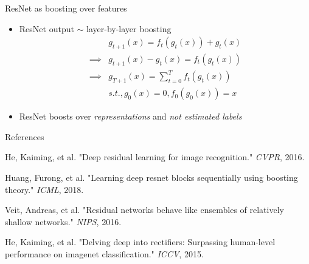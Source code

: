 \documentclass[10pt]{beamer}
\begin{document}
\begin{frame}{ResNet as boosting over features \cite{resnet_as_boosting_huang2018}}
	\begin{itemize}
		\item ResNet output $\sim$ layer-by-layer boosting 
			\begin{equation}
				\begin{split}
				& g_{t+1}(x) = f_t(g_t(x)) + g_t(x) \\
				\implies & g_{t+1}(x) - g_t(x) = f_t(g_t(x))  \\
				\implies & g_{T+1}(x) = \sum_{t=0}^{T}f_t(g_t(x)) \\
				&s.t., g_0(x)=0, f_0(g_0(x)) = x
				\end{split}
			\end{equation}
		\item ResNet boosts over \textit{representations} and \textit{not estimated labels}
	\end{itemize}
\end{frame}

\begin{frame}[allowframebreaks]{References}	
	\begin{thebibliography}{2}

	He, Kaiming, et al. "Deep residual learning for image recognition." \textit{CVPR}, 2016.
	
	Huang, Furong, et al. "Learning deep resnet blocks sequentially using boosting theory." \textit{ICML}, 2018.

	Veit, Andreas, et al. "Residual networks behave like ensembles of relatively shallow networks." \textit{NIPS}, 2016.

	He, Kaiming, et al. "Delving deep into rectifiers: Surpassing human-level performance on imagenet classification." \textit{ICCV}, 2015.
	\end{thebibliography}
\end{frame} 
\end{document}
